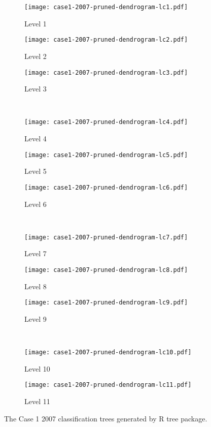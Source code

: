 \begin{appendices}
\begin{figure}[!ht] \centering
	\captionsetup[subfigure]{width=2.0in}
	\begin{subfigure}[t]{0.32\textwidth}
		\texttt{[image: case1-2007-pruned-dendrogram-lc1.pdf]}
		\caption{Level 1}
	\end{subfigure}
	\begin{subfigure}[t]{0.32\textwidth}
		\texttt{[image: case1-2007-pruned-dendrogram-lc2.pdf]}
		\caption{Level 2}
	\end{subfigure}
	\begin{subfigure}[t]{0.32\textwidth}
		\texttt{[image: case1-2007-pruned-dendrogram-lc3.pdf]}
		\caption{Level 3}
	\end{subfigure}\\
	\vspace{5pt}
	\begin{subfigure}[t]{0.32\textwidth}
		\texttt{[image: case1-2007-pruned-dendrogram-lc4.pdf]}
		\caption{Level 4}
	\end{subfigure}
	\begin{subfigure}[t]{0.32\textwidth}
		\texttt{[image: case1-2007-pruned-dendrogram-lc5.pdf]}
		\caption{Level 5}
	\end{subfigure}
	\begin{subfigure}[t]{0.32\textwidth}
		\texttt{[image: case1-2007-pruned-dendrogram-lc6.pdf]}
		\caption{Level 6}
	\end{subfigure}\\
	\vspace{5pt}	
	\begin{subfigure}[t]{0.32\textwidth}
		\texttt{[image: case1-2007-pruned-dendrogram-lc7.pdf]}
		\caption{Level 7}
	\end{subfigure}
	\begin{subfigure}[t]{0.32\textwidth}
		\texttt{[image: case1-2007-pruned-dendrogram-lc8.pdf]}
		\caption{Level 8}
	\end{subfigure}
	\begin{subfigure}[t]{0.32\textwidth}
		\texttt{[image: case1-2007-pruned-dendrogram-lc9.pdf]}
		\caption{Level 9}
	\end{subfigure}\\
	\vspace{5pt}
	\begin{subfigure}[t]{0.32\textwidth}
		\texttt{[image: case1-2007-pruned-dendrogram-lc10.pdf]}
		\caption{Level 10}
	\end{subfigure}
	\begin{subfigure}[t]{0.32\textwidth}
		\texttt{[image: case1-2007-pruned-dendrogram-lc11.pdf]}
		\caption{Level 11}
	\end{subfigure}
	\vspace{5pt}
	\caption[The Case 1 2007 classification trees generated by R tree package.]{The Case 1 2007 classification trees generated by R tree package.}
	\label{fig: appendix-fig.c1.tree}
\end{figure}


\end{appendices}
